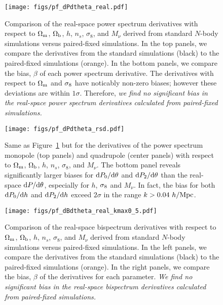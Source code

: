 \begin{figure}
\begin{center}
    \texttt{[image: figs/pf\_dPdtheta\_real.pdf]}
    \caption{Comparison of the real-space power spectrum derivatives with respect
    to $\Omega_{\rm m}$, $\Omega_{\rm b}$, $h$, $n_s$, $\sigma_8$, and $M_\nu$ derived from standard 
    $N$-body simulations versus paired-fixed simulations. In the top panels, we 
    compare the derivatives from the standard simulations (black) to the paired-fixed
    simulations (orange). In the bottom panels, we compare the bias, $\beta$ of 
    each power spectrum derivative. The derivatives with respect 
    to $\Omega_{\rm m}$ and $\sigma_8$ have noticably non-zero biases; however these deviations are
    within $1\sigma$. Therefore, {\em we find no significant bias in the real-space 
    power spectrum derivatives calculated from paired-fixed simulations.}
}
\label{fig:dpk_real}
\end{center}
\end{figure}

\begin{figure}
\begin{center}
    \texttt{[image: figs/pf\_dPdtheta\_rsd.pdf]}
    \caption{Same as Figure~\ref{fig:dpk_real} but for the derivatives of the power
    spectrum monopole (top panels) and quadrupole (center panels) with respect
    to $\Omega_{\rm m}$, $\Omega_{\rm b}$, $h$, $n_s$, $\sigma_8$, and $M_\nu$. The bottom panel reveals
    significantly larger biases for ${\rm d} P_0/{\rm d}\theta$ and ${\rm d} P_2/{\rm d}\theta$
    than the real-space ${\rm d} P/{\rm d}\theta$, especially for $h$, $\sigma_8$ and $M_\nu$. 
    In fact, the bias for both ${\rm d} P_0/{\rm d}h$ and ${\rm d} P_2/{\rm d}h$ exceed 
    $2\sigma$ in the range $k > 0.04~h/{\rm Mpc}$.  
}
\label{fig:dpk_rsd}
\end{center}
\end{figure}

\begin{figure}
\begin{center}
    \texttt{[image: figs/pf\_dBdtheta\_real\_kmax0\_5.pdf]}
    \caption{Comparison of the real-space bispectrum derivatives with respect
    to $\Omega_{\rm m}$, $\Omega_{\rm b}$, $h$, $n_s$, $\sigma_8$, and $M_\nu$ derived from standard 
    $N$-body simulations versus paired-fixed simulations. In the left panels, we 
    compare the derivatives from the standard simulations (black) to the paired-fixed
    simulations (orange). In the right panels, we compare the bias, $\beta$ of
    the derivatives for each parameter. {\em We find no significant bias in the
    real-space bispectrum derivatives calculated from paired-fixed simulations.}
}
\label{fig:dbk_real}
\end{center}
\end{figure}


